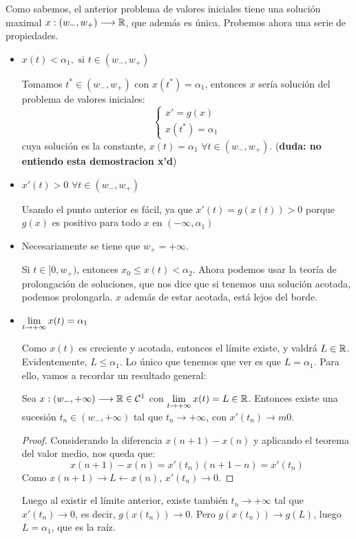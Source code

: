 Como sabemos, el anterior problema de valores iniciales tiene una solución maximal $x : (w_-,w_+) \longrightarrow \mathbb{R}$, que además es única. Probemos ahora una serie de propiedades.
\begin{itemize}
\item $x(t)<\alpha_1, \text{ si } t\in(w_-,w_+)$

Tomamos $t^*\in(w_-,w_+)$ con $x(t^*)=\alpha_1$, entonces $x$ sería solución del problema de valores iniciales:
\[
\left\{
\begin{array}{l}
x'=g(x) \\
x(t^*)=\alpha_1
\end{array}
\right.
\]
cuya solución es la constante, $x(t)=\alpha_1$ $\forall t\in(w_-,w_+)$. (\textbf{duda: no entiendo esta demostracion x'd})

\item $x'(t)>0$ $\forall t\in(w_-,w_+)$

Usando el punto anterior es fácil, ya que $x'(t)=g(x(t))>0$ porque $g(x)$ es positivo para todo $x$ en $(-\infty, \alpha_1)$

\item Necesariamente se tiene que $w_+=+\infty$.

Si $t\in[0,w_+)$, entonces $x_0\leq x(t) < \alpha_2$. Ahora podemos usar la teoría de prolongación de soluciones, que nos dice que si tenemos una solución acotada, podemos prolongarla. $x$ además de estar acotada, está lejos del borde. 

\item $\displaystyle\lim_{  t  \to +\infty }  x(t) =\alpha_1$

Como $x(t)$ es creciente y acotada, entonces el límite existe, y valdrá $L\in\mathbb{R}$. Evidentemente, $L\leq \alpha_1$. Lo único que tenemos que ver es que $L=\alpha_1$. Para ello, vamos a recordar un resultado general:
\begin{lemma}
Sea $x : (w_-,+\infty) \longrightarrow \mathbb{R}\in\mathcal{C}^1$ con $\displaystyle\lim_{  t  \to +\infty }  x(t) =L\in\mathbb{R}$. Entonces existe una sucesión $t_n\in(w_-,+\infty)$ tal que $t_n\longrightarrow +\infty$, con $x'(t_n)\longrightarrow m0$.
\end{lemma}
\begin{proof}
Considerando la diferencia $x(n+1)-x(n)$ y aplicando el teorema del valor medio, nos queda que:
\[
x(n+1)-x(n)=x'(t_n)(n+1-n)=x'(t_n)
\]
Como $x(n+1)\longrightarrow L \leftarrow x(n)$, $x'(t_n)\longrightarrow 0$.
\end{proof}
Luego al existir el límite anterior, existe también $t_n\longrightarrow +\infty$ tal que $x'(t_n)\longrightarrow 0$, es decir, $g(x(t_n))\longrightarrow 0$.  Pero $g(x(t_n))\longrightarrow g(L)$, luego $L=\alpha_1$, que es la raíz.
\end{itemize}

